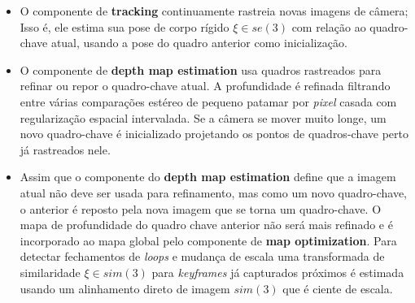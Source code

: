 \begin{itemize}
	\item{O componente de \textbf{tracking} continuamente rastreia novas imagens de câmera; Isso é, ele estima sua pose de corpo rígido $\xi \in se(3)$ com relação ao quadro-chave atual, usando a pose do quadro anterior como inicialização.}
	\item{O componente de \textbf{depth map estimation} usa quadros rastreados para refinar ou repor o quadro-chave atual. A profundidade é refinada filtrando entre várias comparações estéreo de pequeno patamar por \textit{pixel} casada com regularização espacial intervalada. Se a câmera se mover muito longe, um novo quadro-chave é inicializado projetando os pontos de quadros-chave perto já rastreados nele.}
	\item{Assim que o componente do \textbf{depth map estimation} define que a imagem atual não deve ser usada para refinamento, mas como um novo quadro-chave, o anterior é reposto pela nova imagem que se torna um quadro-chave. O mapa de profundidade do quadro chave anterior não será mais refinado e é incorporado ao mapa global pelo componente de \textbf{map optimization}. Para detectar fechamentos de \textit{loops} e mudança de escala uma transformada de similaridade $\xi \in sim(3)$ para \textit{keyframes} já capturados próximos é estimada usando um alinhamento direto de imagem $sim(3)$ que é ciente de escala.}
\end{itemize}